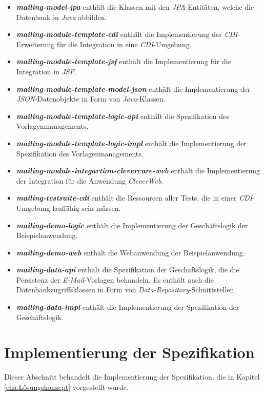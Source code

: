 \begin{itemize}
	\item\emph{\textbf{mailing-model-jpa}} enthält die Klassen mit den \emph{JPA}-Entitäten, welche die Datenbank in \emph{Java} abbilden.
	\item\emph{\textbf{mailing-module-template-cdi}} enthält die Implementierung der \emph{CDI}-Erweiterung für die Integration in eine \emph{CDI}-Umgebung.
	\item\emph{\textbf{mailing-module-template-jsf}} enthält die Implementierung für die Integration in \emph{JSF}.
	\item\emph{\textbf{mailing-module-template-model-json}} enthält die Implementierung der \emph{JSON}-Datenobjekte in Form von \emph{Java}-Klassen.	
	\item\emph{\textbf{mailing-module-template-logic-api}} enthält die Spezifikation des Vorlagenmanagements.
	\item\emph{\textbf{mailing-module-template-logic-impl}} enthält die Implementierung der Spezifikation des Vorlagenmanagements.
	\item\emph{\textbf{mailing-module-integartion-clevercure-web}} enthält die Implementierung der Integration für die Anwendung \emph{CleverWeb}.
	\item\emph{\textbf{mailing-testsuite-cdi}} enthält die Ressourcen aller Tests, die in einer \emph{CDI}-Umgebung lauffähig sein müssen.
	\item\emph{\textbf{mailing-demo-logic}} enthält die Implementierung der Geschäftslogik der Beispielanwendung.
	\item\emph{\textbf{mailing-demo-web}} enthält die Webanwendung der Beispielanwendung.
	\item\emph{\textbf{mailing-data-api}} enthält die Spezifikation der Geschäftslogik, die die Persistenz der \emph{E-Mail}-Vorlagen behandeln. Es enthält auch die Datenbankzugriffsklassen in Form von \emph{Data-Repository}-Schnittstellen.
	\item\emph{\textbf{mailing-data-impl}} enthält die Implementierung der Spezifikation der Geschäftslogik.
\end{itemize} 

\section{Implementierung der Spezifikation}
Dieser Abschnitt behandelt die Implementierung der Spezifikation, die in Kapitel \ref{cha:Lösungskonzept} vorgestellt wurde. 

